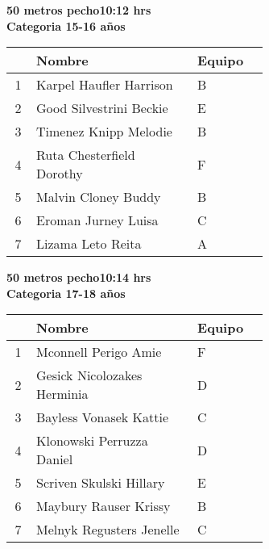 \begin{minipage}{0.95\linewidth}\vspace{0.5cm} 
\begin{flushleft}
\textbf{
\hspace{-0.15cm}50 metros pecho\hspace{1.5cm}10:12 hrs \\Categoria 15-16 años}\vspace{-0.2cm} 
\end{flushleft}
\begin{tabular}{cp{0.63\linewidth}l}
\hline
& \textbf{Nombre} & \textbf{Equipo} \\ \hline
1 & Karpel Haufler Harrison & B \\ 
2 & Good Silvestrini Beckie & E \\ 
3 & Timenez Knipp Melodie & B \\ 
4 & Ruta Chesterfield Dorothy & F \\ 
5 & Malvin Cloney Buddy & B \\ 
6 & Eroman Jurney Luisa & C \\ 
7 & Lizama Leto Reita & A \\ 
\end{tabular}
\end{minipage}
\begin{minipage}{0.95\linewidth}\vspace{0.5cm} 
\begin{flushleft}
\textbf{
\hspace{-0.15cm}50 metros pecho\hspace{1.5cm}10:14 hrs \\Categoria 17-18 años}\vspace{-0.2cm} 
\end{flushleft}
\begin{tabular}{cp{0.63\linewidth}l}
\hline
& \textbf{Nombre} & \textbf{Equipo} \\ \hline
1 & Mconnell Perigo Amie & F \\ 
2 & Gesick Nicolozakes Herminia & D \\ 
3 & Bayless Vonasek Kattie & C \\ 
4 & Klonowski Perruzza Daniel & D \\ 
5 & Scriven Skulski Hillary & E \\ 
6 & Maybury Rauser Krissy & B \\ 
7 & Melnyk Regusters Jenelle & C \\ 
\end{tabular}
\end{minipage}
